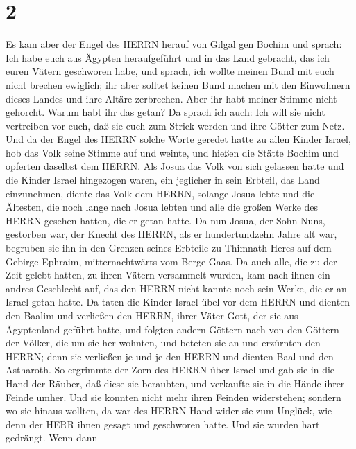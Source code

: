 \hypertarget{section-1}{%
\section{2}\label{section-1}}

 Es kam aber der Engel des HERRN herauf von Gilgal gen
Bochim und sprach: Ich habe euch aus Ägypten heraufgeführt und in das
Land gebracht, das ich euren Vätern geschworen habe, und sprach, ich
wollte meinen Bund mit euch nicht brechen ewiglich;  ihr
aber solltet keinen Bund machen mit den Einwohnern dieses Landes und
ihre Altäre zerbrechen. Aber ihr habt meiner Stimme nicht gehorcht.
Warum habt ihr das getan?  Da sprach ich auch: Ich will sie
nicht vertreiben vor euch, daß sie euch zum Strick werden und ihre
Götter zum Netz.  Und da der Engel des HERRN solche Worte
geredet hatte zu allen Kinder Israel, hob das Volk seine Stimme auf und
weinte,  und hießen die Stätte Bochim und opferten daselbst
dem HERRN.  Als Josua das Volk von sich gelassen hatte und
die Kinder Israel hingezogen waren, ein jeglicher in sein Erbteil, das
Land einzunehmen,  diente das Volk dem HERRN, solange Josua
lebte und die Ältesten, die noch lange nach Josua lebten und alle die
großen Werke des HERRN gesehen hatten, die er getan hatte. 
Da nun Josua, der Sohn Nuns, gestorben war, der Knecht des HERRN, als er
hundertundzehn Jahre alt war,  begruben sie ihn in den
Grenzen seines Erbteile zu Thimnath-Heres auf dem Gebirge Ephraim,
mitternachtwärts vom Berge Gaas.  Da auch alle, die zu der
Zeit gelebt hatten, zu ihren Vätern versammelt wurden, kam nach ihnen
ein andres Geschlecht auf, das den HERRN nicht kannte noch sein Werke,
die er an Israel getan hatte.  Da taten die Kinder Israel
übel vor dem HERRN und dienten den Baalim  und verließen
den HERRN, ihrer Väter Gott, der sie aus Ägyptenland geführt hatte, und
folgten andern Göttern nach von den Göttern der Völker, die um sie her
wohnten, und beteten sie an und erzürnten den HERRN;  denn
sie verließen je und je den HERRN und dienten Baal und den Astharoth.
 So ergrimmte der Zorn des HERRN über Israel und gab sie in
die Hand der Räuber, daß diese sie beraubten, und verkaufte sie in die
Hände ihrer Feinde umher. Und sie konnten nicht mehr ihren Feinden
widerstehen;  sondern wo sie hinaus wollten, da war des
HERRN Hand wider sie zum Unglück, wie denn der HERR ihnen gesagt und
geschworen hatte. Und sie wurden hart gedrängt.  Wenn dann
